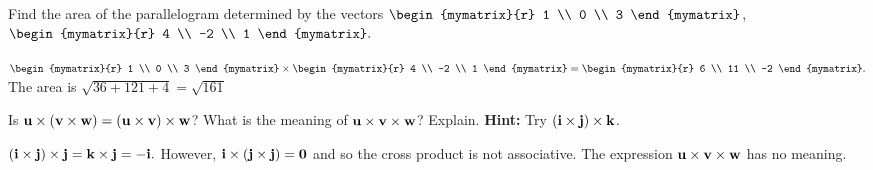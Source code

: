 \begin{enumialphparenastyle}
\begin{ex} Find the area of the parallelogram determined by the vectors
$\begin{mymatrix}{r}
1 \\
0 \\
3
\end{mymatrix} $, $\begin{mymatrix}{r}
4 \\
-2 \\
1
\end{mymatrix} .$
\begin{sol}
$\begin{mymatrix}{r}
1 \\
0 \\
3
\end{mymatrix} \times
\begin{mymatrix}{r}
4 \\
-2 \\
1
\end{mymatrix} =\begin{mymatrix}{r}
6 \\
11 \\
-2
\end{mymatrix} .$ The area is $\sqrt{36+121+4}= \sqrt{161}$
\end{sol}
\end{ex}


\begin{ex} Is $\mbox{\bf u}\times \left(\mbox{\bf v}\times \mbox{\bf w}\right) =\left(
\mbox{\bf u}\times \mbox{\bf v}\right) \times \mbox{\bf w}$? What is the meaning of 
$\mbox{\bf u}\times \mbox{\bf v}\times \mbox{\bf w}$? Explain. 
\textbf{Hint: }Try $\left(\mbox{\bf i}\times \mbox{\bf j}
\right)\times \mbox{\bf k}$.
\begin{sol}
 $\left(\mbox{\bf i}\times \mbox{\bf j}\right) \times
\mbox{\bf j}=\mbox{\bf k}\times \mbox{\bf j}=-\mbox{\bf i}.$ However, $\mbox{\bf i}\times \left(\mbox{\bf j}\times \mbox{\bf j}
\right) =\mbox{\bf 0}$ and so the cross product is not associative. The
expression $\mbox{\bf u}\times \mbox{\bf v}\times \mbox{\bf w}$ has no meaning.
\end{sol}
\end{ex}


\end{enumialphparenastyle}
